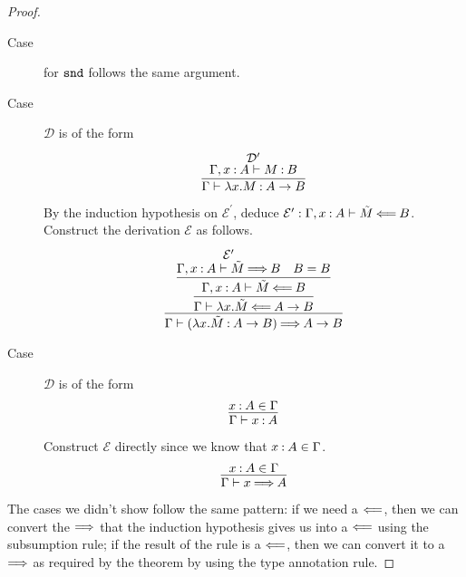 \documentclass[11pt,letterpaper]{article}
\begin{document}
\begin{proof}
\begin{description}
    \item[Case]
      for $\operatorname{\mathtt{snd}}$ follows the same argument.

    \item[Case]
      $\mathcal{D}$ is of the form
      \begin{equation*}
        \infer{
          \Gamma \proves \lambda x. M \hastype A \to B
        }{
          \deduce[\mathcal{D}^\prime]{
            \Gamma, x \hastype A \proves M \hastype B
          }{}
        }
      \end{equation*}

      By the induction hypothesis on $\mathcal{E}^\prime$,
      deduce
      $\mathcal{E}^\prime : \Gamma, x \mathbin{:} A \vdash \tilde M \mathbin{\Longleftarrow} B$.
      Construct the derivation $\mathcal{E}$ as follows.
      \begin{equation*}
        \infer{
          \Gamma \proves (\lambda x. \tilde M \hastype A \to B) \synth A \to B
        }{
          \infer{
            \Gamma \proves \lambda x. \tilde M \checks A \to B
          }{
            \infer{
              \Gamma, x \hastype A \proves \tilde M \checks B
            }{
              \deduce[\mathcal{E}^\prime]{
                \Gamma, x \hastype A \proves \tilde M \synth B
              }{}
              &
              B = B
            }
          }
        }
      \end{equation*}

    \item[Case]
      $\mathcal{D}$ is of the form
      \begin{equation*}
        \infer{
          \Gamma \proves x \hastype A
        }{
          x \hastype A \in \Gamma
        }
      \end{equation*}

      Construct $\mathcal{E}$ directly since we know that
      $x \mathbin{:} A \in \Gamma$.
      \begin{equation*}
        \infer{
          \Gamma \proves x \synth A
        }{
          x \hastype A \in \Gamma
        }
      \end{equation*}
  \end{description}

  The cases we didn't show follow the same pattern:
  if we need a $\mathbin{\Longleftarrow}$, then we can convert the $\mathbin{\Longrightarrow}$ that the induction
  hypothesis gives us into a $\mathbin{\Longleftarrow}$ using the subsumption rule;
  if the result of the rule is a $\mathbin{\Longleftarrow}$, then we can convert it to a
  $\mathbin{\Longrightarrow}$ as required by the theorem by using the type annotation rule.
\end{proof}
\end{document}
